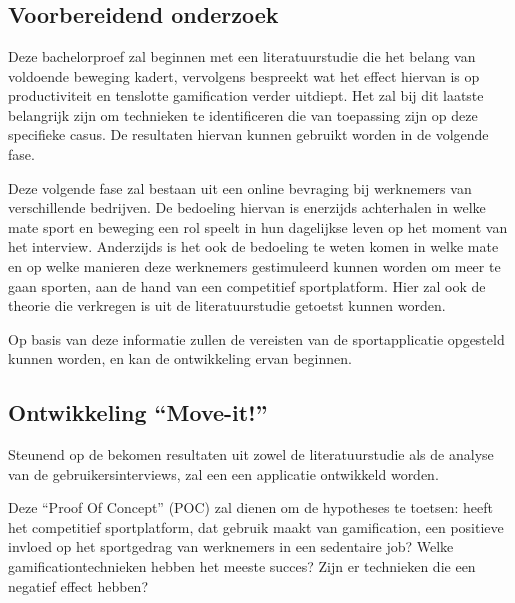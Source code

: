 
\chapter{}%
\label{ch:methodologie}

\section{Voorbereidend onderzoek}
Deze bachelorproef zal beginnen met een literatuurstudie die het belang van voldoende beweging kadert, vervolgens bespreekt wat het effect hiervan is op productiviteit en tenslotte gamification verder uitdiept. Het zal bij dit laatste belangrijk zijn om technieken te identificeren die van toepassing zijn op deze specifieke casus. De resultaten hiervan kunnen gebruikt worden in de volgende fase.

Deze volgende fase zal bestaan uit een online bevraging bij werknemers van verschillende bedrijven. De bedoeling hiervan is enerzijds achterhalen in welke mate sport en beweging een rol speelt in hun dagelijkse leven op het moment van het interview. Anderzijds is het ook de bedoeling te weten komen in welke mate en op welke manieren deze werknemers gestimuleerd kunnen worden om meer te gaan sporten, aan de hand van een competitief sportplatform. Hier zal ook de theorie die verkregen is uit de literatuurstudie getoetst kunnen worden.

Op basis van deze informatie zullen de vereisten van de sportapplicatie opgesteld kunnen worden, en kan de ontwikkeling ervan beginnen.

\section{Ontwikkeling ``Move-it!''}

Steunend op de bekomen resultaten uit zowel de literatuurstudie als de analyse van de gebruikersinterviews, zal een een applicatie ontwikkeld worden.

Deze ``Proof Of Concept'' (POC) zal dienen om de hypotheses te toetsen: heeft het competitief sportplatform, dat gebruik maakt van gamification, een positieve invloed op het sportgedrag van werknemers in een sedentaire job? Welke gamificationtechnieken hebben het meeste succes? Zijn er technieken die een negatief effect hebben?

